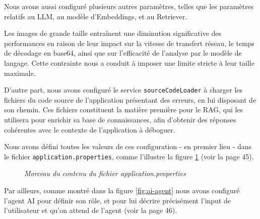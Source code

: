 \documentclass[12pt,a4paper]{report}
\begin{document}
	Nous avons aussi configuré plusieurs autres paramètres, telles que les paramètres relatifs au LLM, au modèle d'Embeddings, et au Retriever.
	
	Les images de grande taille entraînent une diminution significative des performances en raison de leur impact sur la vitesse de transfert réseau, le temps de décodage en base64, ainsi que sur l'efficacité de l'analyse par le modèle de langage. Cette contrainte nous a conduit à imposer une limite stricte à leur taille maximale.
	
	D'autre part, nous avons configuré le service \verb|sourceCodeLoader| à charger les fichiers du code source de l'application présentant des erreurs, en lui disposant de son chemin. Ces fichiers constituent la matière première pour le RAG, qui les utilisera pour enrichir sa base de connaissances, afin d'obtenir des réponses cohérentes avec le contexte de l'application à déboguer.
	
	Nous avons défini toutes les valeurs de ces configuration - en premier lieu - dans le fichier \verb|application.properties|, comme l'illustre la figure \ref{fig:properties} (voir la page 45).
	
	\begin{figure}[H]
		\centering
		\caption{\textit{Morceau du contenu du fichier application.properties}}
		\label{fig:properties}
	\end{figure}
	
	Par ailleurs, comme montré dans la figure \ref{fig:ai-agent} nous avons configuré l'agent AI pour définir son rôle, et pour lui décrire précisément l'input de l'utilisateur et qu'on attend de l'agent (voir la page 46).
	
\end{document}
